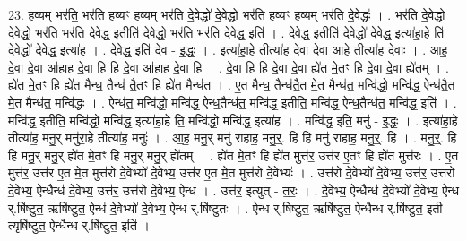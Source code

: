 \documentclass[17pt]{extarticle}
\begin{document}
23. ह॒व्यम् भर॑ति॒ भर॑ति ह॒व्यꣳ ह॒व्यम् भर॑ति दे॒वेद्धो॑ दे॒वेद्धो॒ भर॑ति ह॒व्यꣳ ह॒व्यम् भर॑ति दे॒वेद्धः॑ । . भर॑ति दे॒वेद्धो॑ दे॒वेद्धो॒ भर॑ति॒ भर॑ति दे॒वेद्ध॒ इतीति॑ दे॒वेद्धो॒ भर॑ति॒ भर॑ति दे॒वेद्ध॒ इति॑ । . दे॒वेद्ध॒ इतीति॑ दे॒वेद्धो॑ दे॒वेद्ध॒ इत्या॑हा॒हे ति॑ दे॒वेद्धो॑ दे॒वेद्ध॒ इत्या॑ह । . दे॒वेद्ध॒ इति॑ दे॒व - इ॒द्धः॒ । . इत्या॑हा॒हे तीत्या॑ह दे॒वा दे॒वा आ॒हे तीत्या॑ह दे॒वाः । . आ॒ह॒ दे॒वा दे॒वा आ॑हाह दे॒वा हि हि दे॒वा आ॑हाह दे॒वा हि । . दे॒वा हि हि दे॒वा दे॒वा ह्ये॑त मे॒तꣳ हि दे॒वा दे॒वा ह्ये॑तम् । . ह्ये॑त मे॒तꣳ हि ह्ये॑त मैन्ध॒ तैन्ध॑ तै॒तꣳ हि ह्ये॑त मैन्ध॑त । . ए॒त मैन्ध॒ तैन्ध॑तै॒त मे॒त मैन्ध॑त॒ मन्वि॑द्धो॒ मन्वि॑द्ध॒ ऐन्ध॑तै॒त मे॒त मैन्ध॑त॒ मन्वि॑द्धः । . ऐन्ध॑त॒ मन्वि॑द्धो॒ मन्वि॑द्ध॒ ऐन्ध॒तैन्ध॑त॒ मन्वि॑द्ध॒ इतीति॒ मन्वि॑द्ध॒ ऐन्ध॒तैन्ध॑त॒ मन्वि॑द्ध॒ इति॑ । . मन्वि॑द्ध॒ इतीति॒ मन्वि॑द्धो॒ मन्वि॑द्ध॒ इत्या॑हा॒हे ति॒ मन्वि॑द्धो॒ मन्वि॑द्ध॒ इत्या॑ह । . मन्वि॑द्ध॒ इति॒ मनु॑ - इ॒द्धः॒ । . इत्या॑हा॒हे तीत्या॑ह॒ मनु॒र् मनु॑रा॒हे तीत्या॑ह॒ मनुः॑ । . आ॒ह॒ मनु॒र् मनु॑ राहाह॒ मनु॒र्॒. हि हि मनु॑ राहाह॒ मनु॒र्॒. हि । . मनु॒र्॒. हि हि मनु॒र् मनु॒र् ह्ये॑त मे॒तꣳ हि मनु॒र् मनु॒र् ह्ये॑तम् । . ह्ये॑त मे॒तꣳ हि ह्ये॑त मुत्त॑र॒ उत्त॑र ए॒तꣳ हि ह्ये॑त मुत्त॑रः । . ए॒त मुत्त॑र॒ उत्त॑र ए॒त मे॒त मुत्त॑रो दे॒वेभ्यो॑ दे॒वेभ्य॒ उत्त॑र ए॒त मे॒त मुत्त॑रो दे॒वेभ्यः॑ । . उत्त॑रो दे॒वेभ्यो॑ दे॒वेभ्य॒ उत्त॑र॒ उत्त॑रो दे॒वेभ्य॒ ऐन्धैन्ध॑ दे॒वेभ्य॒ उत्त॑र॒ उत्त॑रो दे॒वेभ्य॒ ऐन्ध॑ । . उत्त॑र॒ इत्युत् - त॒रः॒ । . दे॒वेभ्य॒ ऐन्धैन्ध॑ दे॒वेभ्यो॑ दे॒वेभ्य॒ ऐन्ध र्.षि॑ष्टुत॒ ऋषि॑ष्टुत॒ ऐन्ध॑ दे॒वेभ्यो॑ दे॒वेभ्य॒ ऐन्ध र्.षि॑ष्टुतः । . ऐन्ध र्.षि॑ष्टुत॒ ऋषि॑ष्टुत॒ ऐन्धैन्ध र्.षि॑ष्टुत॒ इती त्यृषि॑ष्टुत॒ ऐन्धैन्ध र्.षि॑ष्टुत॒ इति॑ । \newline
\end{document}
